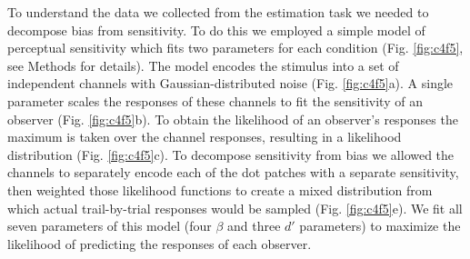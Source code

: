 To understand the data we collected from the estimation task we needed to decompose bias from sensitivity. To do this we employed a simple model of perceptual sensitivity which fits two parameters for each condition (Fig. \ref{fig:c4f5}, see Methods for details). The model encodes the stimulus into a set of independent channels with Gaussian-distributed noise (Fig. \ref{fig:c4f5}a). A single parameter scales the responses of these channels to fit the sensitivity of an observer (Fig. \ref{fig:c4f5}b). To obtain the likelihood of an observer's responses the maximum is taken over the channel responses, resulting in a likelihood distribution (Fig. \ref{fig:c4f5}c). To decompose sensitivity from bias we allowed the channels to separately encode each of the dot patches with a separate sensitivity, then weighted those likelihood functions to create a mixed distribution from which actual trail-by-trial responses would be sampled (Fig. \ref{fig:c4f5}e). We fit all seven parameters of this model (four $\beta$ and three $d'$ parameters) to maximize the likelihood of predicting the responses of each observer. 

